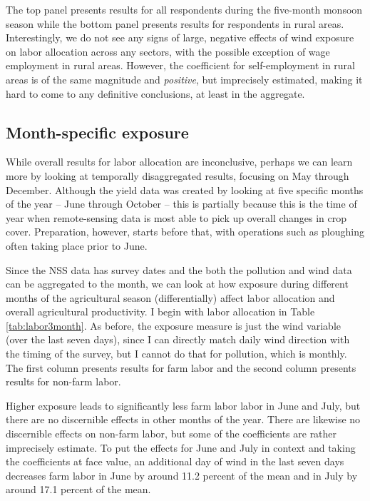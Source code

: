 \documentclass[
]{article}
\begin{document}
The top panel presents results for all respondents during the five-month monsoon season while the bottom panel presents results for respondents in rural areas. Interestingly, we do not see any signs of large, negative effects of wind exposure on labor allocation across any sectors, with the possible exception of wage employment in rural areas. However, the coefficient for self-employment in rural areas is of the same magnitude and \emph{positive}, but imprecisely estimated, making it hard to come to any definitive conclusions, at least in the aggregate.

\hypertarget{month-specific-exposure}{%
\subsection{Month-specific exposure}\label{month-specific-exposure}}

While overall results for labor allocation are inconclusive, perhaps we can learn more by looking at temporally disaggregated results, focusing on May through December. Although the yield data was created by looking at five specific months of the year -- June through October -- this is partially because this is the time of year when remote-sensing data is most able to pick up overall changes in crop cover. Preparation, however, starts before that, with operations such as ploughing often taking place prior to June.

Since the NSS data has survey dates and the both the pollution and wind data can be aggregated to the month, we can look at how exposure during different months of the agricultural season (differentially) affect labor allocation and overall agricultural productivity. I begin with labor allocation in Table \ref{tab:labor3month}. As before, the exposure measure is just the wind variable (over the last seven days), since I can directly match daily wind direction with the timing of the survey, but I cannot do that for pollution, which is monthly. The first column presents results for farm labor and the second column presents results for non-farm labor.

Higher exposure leads to significantly less farm labor labor in June and July, but there are no discernible effects in other months of the year. There are likewise no discernible effects on non-farm labor, but some of the coefficients are rather imprecisely estimate. To put the effects for June and July in context and taking the coefficients at face value, an additional day of wind in the last seven days decreases farm labor in June by around 11.2 percent of the mean and in July by around 17.1 percent of the mean.
\end{document}
